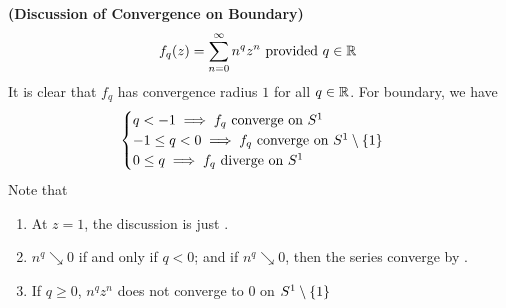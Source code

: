 \documentclass{report}
\begin{document}
\begin{Example}{\textbf{(Discussion of Convergence on Boundary)}}{}
\begin{align*}
f_q(z)=\sum_{n=0}^\infty n^q z^n \text{ provided $q\in\mathbb{R}$ }
\end{align*}
It is clear that  $f_q$ has convergence radius  $1$ for all  $q\in\mathbb{R}$. For boundary, we have
\begin{align*}
\begin{cases}
  q<-1 \implies f_q\text{ converge on $S^1$ }\\
  -1\leq q<0 \implies f_q\text{ converge on }S^1\setminus \{ 1 \}\\
  0 \leq q \implies f_q \text{ diverge on }S^1
\end{cases}
\end{align*}
Note that
\begin{enumerate}[label=(\alph*)]
  \item At $z=1$, the discussion is just .  
  \item $n^q\searrow 0$ if and only if  $q<0$; and if  $n^q\searrow 0$, then the series converge by  .  
  \item If $q\geq 0$, $n^qz^n$ does not converge to  $0$ on  $S^1\setminus \{ 1 \}$
\end{enumerate}
\end{Example}
\end{document}
